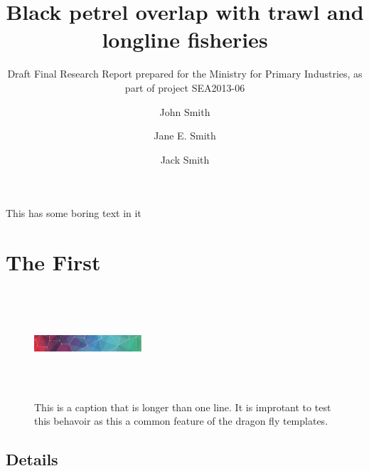 \documentclass[draft]{dragonfly-report}
\title{Black petrel overlap with trawl and longline fisheries}{Overlap of the distribution of black petrel (\emph{Procellaria parkinsoni}) with  New Zealand trawl and longline fisheries}
\subtitle{Draft Final Research Report prepared for the Ministry for Primary Industries, as part of project SEA2013-06}
\author{John Smith \and Jane E. Smith \and Jack Smith}
\begin{document}


\maketitle

\tableofcontents

\summary%

This has some boring text in it

\section{The First}

\lipsum[1]


\begin{figure}[h]
  \includegraphics[width=40mm,height=40mm]{pattern}
  \caption{This is a caption that is longer than one line. It is improtant to test 
  this behavoir as this a common feature of the dragon fly templates.}
\end{figure}

\subsection{Details}

\lipsum[2]
\end{document}
